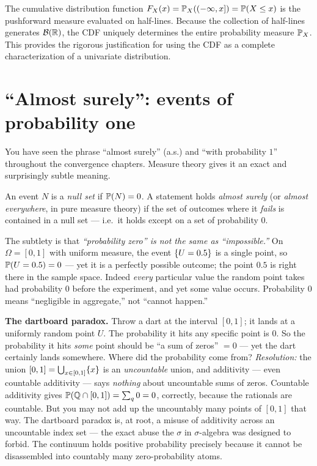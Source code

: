 \begin{connectionbox}
The cumulative distribution function $F_X(x) = \P_X((-\infty, x]) = \P(X \le x)$ is
the pushforward measure evaluated on half-lines. Because the collection of half-lines
generates $\mathcal{B}(\R)$, the CDF uniquely determines the entire probability measure
$\P_X$. This provides the rigorous justification for using the CDF as a complete
characterization of a univariate distribution.
\end{connectionbox}

\section{``Almost surely'': events of probability one}
\label{ch36:almost-surely}

You have seen the phrase ``almost surely'' (a.s.) and ``with probability $1$''
throughout the convergence chapters. Measure theory gives it an exact and
surprisingly subtle meaning.

\begin{definition}
\label{ch36:null}
An event $N$ is a \emph{null set} if $\P(N) = 0$. A statement holds
\emph{almost surely} (or \emph{almost everywhere}, in pure measure theory) if the
set of outcomes where it \emph{fails} is contained in a null set --- i.e.\ it holds
except on a set of probability $0$.
\end{definition}

The subtlety is that \emph{``probability zero'' is not the same as
``impossible.''} On $\Omega = [0,1]$ with uniform measure, the event
$\set{U = 0.5}$ is a single point, so $\P(U = 0.5) = 0$ --- yet it is a perfectly
possible outcome; the point $0.5$ is right there in the sample space. Indeed
\emph{every} particular value the random point takes had probability $0$ before
the experiment, and yet some value occurs. Probability $0$ means
``negligible in aggregate,'' not ``cannot happen.''

\begin{paradoxbox}
\textbf{The dartboard paradox.} Throw a dart at the interval $[0,1]$; it lands at a
uniformly random point $U$. The probability it hits any specific point is $0$. So
the probability it hits \emph{some} point should be ``a sum of zeros''
$=0$ --- yet the dart certainly lands somewhere. Where did the probability come
from? \emph{Resolution:} the union $[0,1] = \bigcup_{x \in [0,1]} \set{x}$ is an
\emph{uncountable} union, and additivity --- even countable additivity --- says
\emph{nothing} about uncountable sums of zeros. Countable additivity gives
$\P(\Q \cap [0,1]) = \sum_{q} 0 = 0$, correctly, because the rationals are
countable. But you may not add up the uncountably many points of $[0,1]$ that way.
The dartboard paradox is, at root, a misuse of additivity across an uncountable
index set --- the exact abuse the $\sigma$ in $\sigma$-algebra was designed to
forbid. The continuum holds positive probability precisely because it cannot be
disassembled into countably many zero-probability atoms.
\end{paradoxbox}

